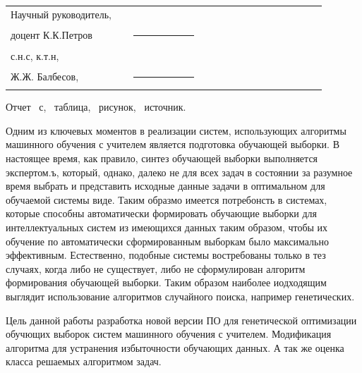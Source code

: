 \documentclass[utf8,usehyperref,12pt]{G7-32}
\begin{document}

\frontmatter %



\Executors %
\begin{longtable}{p{0.35\linewidth}p{0.2\linewidth}p{0.35\linewidth}}
Научный руководитель, 	&		&	\\
доцент К.К.Петров	&\rule{1\linewidth}{0.1pt}	&  \\ \vspace{1cm}

с.н.с, к.т.н,  &		&	\\
Ж.Ж. Балбесов, & \rule{1\linewidth}{0.1pt}& \\
\end{longtable}
\Referat
 Отчет \totalpages~с, \totaltables~таблица, \totalfigures~рисунок, \totalbibs~источник.
\tableofcontents

\Introduction
Одним из ключевых моментов в реализации систем, использующих алгоритмы машинного обучения с учителем является подготовка обучающей выборки. В настоящее время, как правило, синтез обучающей выборки выполняется экспертом.ъ, который, однако, далеко не для всех задач в состоянии за разумное время выбрать и представить исходные данные задачи в оптимальном для обучаемой системы виде. Таким образмо имеется потребонсть в системах, которые способны автоматически формировать обучающие выборки для интеллектуальных систем из имеющихся данных таким образом, чтобы их обучение по автоматически сформированным выборкам было максимально эффективным. Естественно, подобные системы востребованы только в тез случаях, когда либо не существует, либо не сформулирован алгоритм формирования обучающей выборки. Таким образом наиболее иодходящим выглядит использование алгоритмов случайного поиска, например генетических.

Цель данной работы разработка новой версии ПО для генетической оптимизации обучющих выборок систем машинного обучения с учителем. Модификация алгоритма для устранения избыточности обучающих данных. А так же оценка класса решаемых алгоритмом задач.

\mainmatter %
\end{document}
